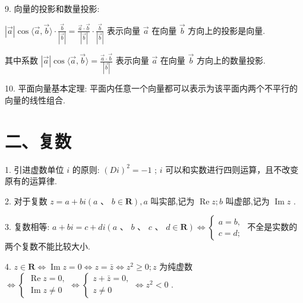 9. 向量的投影和数量投影:

$\left| \overrightarrow{a}\right| \cos \langle \overrightarrow{a},\overrightarrow{b}\rangle  \cdot  \frac{\overrightarrow{b}}{\left| \overrightarrow{b}\right| } = \frac{\overrightarrow{a} \cdot  \overrightarrow{b}}{\left| \overrightarrow{b}\right| } \cdot  \frac{\overrightarrow{b}}{\left| \overrightarrow{b}\right| }$ 表示向量 $\overrightarrow{a}$ 在向量 $\overrightarrow{b}$ 方向上的投影是向量.

其中系数 $\left| \overrightarrow{a}\right| \cos \langle \overrightarrow{a},\overrightarrow{b}\rangle  = \frac{\overrightarrow{a} \cdot  \overrightarrow{b}}{\left| \overrightarrow{b}\right| }$ 表示向量 $\overrightarrow{a}$ 在向量 $\overrightarrow{b}$ 方向上的数量投影.

10. 平面向量基本定理: 平面内任意一个向量都可以表示为该平面内两个不平行的向量的线性组合.

\section*{二、复数}

1. 引进虚数单位 ${i}$ 的原则: ${\left( {D}{i}\right) }^{2} =  - 1$ ;    ${i}$ 可以和实数进行四则运算，且不改变原有的运算律.

2. 对于复数 $z = a + b{i}\left( {a\text{ 、 }b \in  \mathbf{R}}\right) ,a$ 叫实部,记为 $\operatorname{Re}z;b$ 叫虚部,记为 $\operatorname{Im}z$ .

3. 复数相等: $a + b{i} = c + d{i}\left( {a\text{ 、 }b\text{ 、 }c\text{ 、 }d \in  \mathbf{R}}\right)  \Leftrightarrow  \left\{  \begin{array}{l} a = b, \\  c = d; \end{array}\right.$ 不全是实数的两个复数不能比较大小.

4. $z \in  \mathbf{R} \Leftrightarrow  \operatorname{Im}z = 0 \Leftrightarrow  z = \bar{z} \Leftrightarrow  {z}^{2} \geq  0;z$ 为纯虚数 $\Leftrightarrow  \left\{  {\begin{array}{l} \operatorname{Re}z = 0, \\  \operatorname{Im}z \neq  0 \end{array} \Leftrightarrow  \left\{  {\begin{array}{l} z + \bar{z} = 0, \\  z \neq  0 \end{array} \Leftrightarrow  {z}^{2} < 0}\right. }\right.$ .

\HRule

